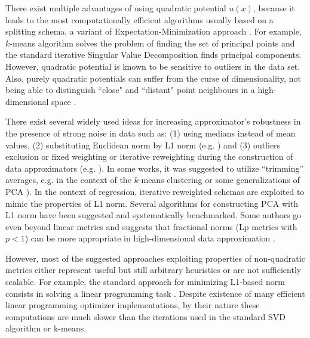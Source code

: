 \documentclass[preprint,12pt]{elsarticle}
\begin{document}
There exist multiple advantages of using quadratic potential $u(x)$, because it leads to the most computationally efficient algorithms usually based on a splitting schema, a variant of Expectation-Minimization approach \cite{Gorban2009}. For example, $k$-means algorithm solves the problem of finding the set of principal points and the standard iterative Singular Value Decomposition finds principal components. However, quadratic potential is known to be sensitive to outliers in the data set. Also, purely quadratic potentials can suffer from the curse of dimensionality, not being able to distinguish ``close" and ``distant" point neighbours in a high-dimensional space \cite{???}.

There exist several widely used ideas for increasing approximator's robustness in the presence of strong noise in data such as: (1) using medians instead of mean values, (2) substituting Euclidean norm by L1 norm (e.g. \citet{Ding2006, hauberg2014}) and (3) outliers exclusion or fixed weighting or iterative reweighting during the construction of data approximators (e.g. \citet{Xu1995,allende2004robust,kohonen2001self}). In some works, it was suggested to utilize ``trimming'' averages, e.g. in the context of the $k$-means clustering or some generalizations of PCA \citet{cuesta1997,hauberg2014}). In the context of regression, iterative reweighted schemas are exploited to mimic the properties of L1 norm\cite{Lu2015}. Several algorithms for constructing PCA with L1 norm have been suggested \cite{Brooks2013,???,???} and systematically benchmarked\cite{???}. Some authors go even beyond linear metrics and suggests that fractional norms (Lp metrics with $p<1$) can be more appropriate in high-dimensional data approximation \cite{}.

However, most of the suggested approaches exploiting properties of non-quadratic metrics either represent useful but still arbitrary heuristics or are not sufficiently scalable. For example, the standard approach for minimizing L1-based norm consists in solving a linear programming task \cite{}. Despite existence of many efficient linear programming optimizer implementations, by their nature these computations are much slower than the iterations used in the standard SVD algorithm or k-means.
\end{document}
